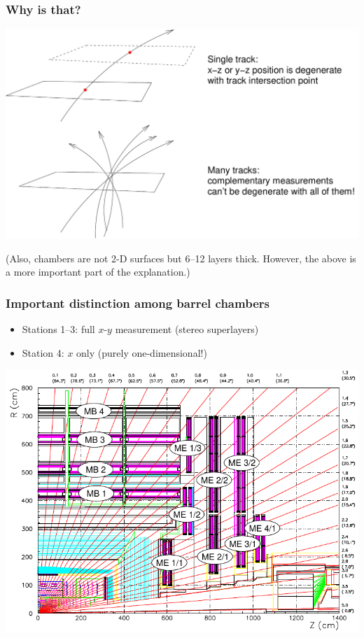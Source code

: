 \documentclass[compress]{beamer}
\begin{document}
\begin{frame}
\frametitle{Why is that?}
\begin{center}
\includegraphics[width=0.85\linewidth]{why_is_that2.pdf}
\end{center}

(Also, chambers are not 2-D surfaces but 6--12 layers thick.  However, the above is a more important part of the explanation.)
\end{frame}

\begin{frame}
\frametitle{Important distinction among barrel chambers}
\begin{itemize}
\item Stations 1--3: full $x$-$y$ measurement (stereo superlayers)
\item Station 4: $x$ only (purely one-dimensional!)
\end{itemize}
\begin{center}
\includegraphics[width=0.75\linewidth]{muon_system_labeled.pdf}
\end{center}
\end{frame}
\end{document}
